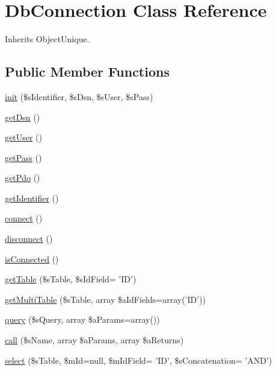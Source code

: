 \hypertarget{class_db_connection}{\section{Db\-Connection Class Reference}
\label{class_db_connection}
}


Inherits Object\-Unique.

\subsection*{Public Member Functions}
\begin{DoxyCompactItemize}
\item 
\hyperlink{class_db_connection_a49c66ab54641f3a1e553a7e643b5c7a8}{init} (\$s\-Identifier, \$s\-Dsn, \$s\-User, \$s\-Pass)
\item 
\hyperlink{class_db_connection_a945af842314b399eca5af3c386f006bd}{get\-Dsn} ()
\item 
\hyperlink{class_db_connection_a8a2466ed0cfd8ad83c8567cbd7508dfa}{get\-User} ()
\item 
\hyperlink{class_db_connection_a52ff2ae755efaa935c79e09f0ac690a0}{get\-Pass} ()
\item 
\hyperlink{class_db_connection_a02ad97e6bc80a2caa7d440327f2b5483}{get\-Pdo} ()
\item 
\hyperlink{class_db_connection_a62dc96f2921f8e69a555352c7b7bd53f}{get\-Identifier} ()
\item 
\hyperlink{class_db_connection_a42741e1c5c39cb28b3ec47d7ac69a315}{connect} ()
\item 
\hyperlink{class_db_connection_a4876746134e556f69028877d061083ed}{disconnect} ()
\item 
\hyperlink{class_db_connection_a094ea04215aed212fc6757335f665088}{is\-Connected} ()
\item 
\hyperlink{class_db_connection_a3f2b3ebb47cfb2291f02eb8d48fc4d07}{get\-Table} (\$s\-Table, \$s\-Id\-Field= 'I\-D')
\item 
\hyperlink{class_db_connection_af5dece058ebbd7e29126360e8dcf8890}{get\-Multi\-Table} (\$s\-Table, array \$a\-Id\-Fields=array('I\-D'))
\item 
\hyperlink{class_db_connection_ae5144ffd2bfc7fff6bb4847d293e26d8}{query} (\$s\-Query, array \$a\-Params=array())
\item 
\hyperlink{class_db_connection_a96b5e2fdad36ec81aae1a3a26ad7acd7}{call} (\$s\-Name, array \$a\-Params, array \$a\-Returns)
\item 
\hyperlink{class_db_connection_ac0fd349a2a6521372a9b68eeb48e4fab}{select} (\$s\-Table, \$m\-Id=null, \$m\-Id\-Field= 'I\-D', \$s\-Concatenation= 'A\-N\-D')

\end{DoxyCompactItemize}
